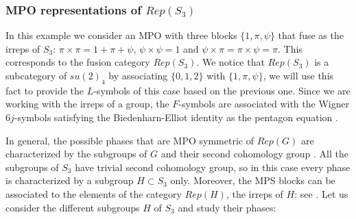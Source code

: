 \documentclass[a4paper,twocolumn,11pt,accepted=2023-02-10]{quantumarticle}
\begin{document}
\subsubsection{MPO representations of $Rep(S_3)$}
In this example we consider an MPO with three blocks $\{1,\pi, \psi \}$ that fuse as the irreps of $S_3$: $\pi\times \pi = 1+\pi+\psi$, $\psi \times \psi = 1$ and $\psi \times \pi = \pi \times \psi = \pi$. This corresponds to the fusion category $Rep(S_3)$. We notice that $Rep(S_3)$ is a subcategory of $su(2)_4$ by associating $\{ 0, 1, 2\}$ with $\{ 1, \pi, \psi \}$, we will use this fact to provide the ${L}$-symbols of this case based on the previous one. Since we are working with the irreps of a group, the ${F}$-symbols are associated with the Wigner $6j$-symbols satisfying the Biedenharn-Elliot identity as the pentagon equation \cite{Lootens21A}. 

In general, the possible phases that are MPO symmetric of $Rep(G)$ are characterized by the subgroups of $G$ and their second cohomology group \cite{etingof2003finite}. All the subgroups of $S_3$ have trivial second cohomology group, so in this case every phase is characterized by a subgroup $H\subset S_3$ only. Moreover, the MPS blocks can be associated to the elements of the category $Rep(H)$, the irreps of $H$: see \cite{etingof2003finite}. Let us consider the different subgroups $H$ of $S_3$ and study their phases:
\end{document}
